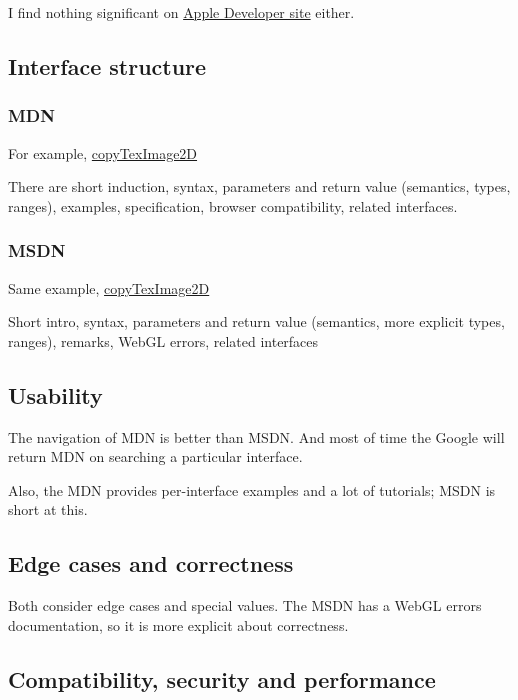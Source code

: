 I find nothing significant on \href{https://developer.apple.com}{Apple
Developer site} either.

\subsection{Interface structure}\label{interface-structure}

\subsubsection{MDN}\label{mdn}

For example,
\href{https://developer.mozilla.org/en-US/docs/Web/API/WebGLRenderingContext/copyTexImage2D}{copyTexImage2D}

There are short induction, syntax, parameters and return value
(semantics, types, ranges), examples, specification, browser
compatibility, related interfaces.

\subsubsection{MSDN}\label{msdn}

Same example,
\href{https://msdn.microsoft.com/en-us/library/dn302380(v=vs.85).aspx}{copyTexImage2D}

Short intro, syntax, parameters and return value (semantics, more
explicit types, ranges), remarks, WebGL errors, related interfaces

\subsection{Usability}\label{usability}

The navigation of MDN is better than MSDN. And most of time the Google
will return MDN on searching a particular interface.

Also, the MDN provides per-interface examples and a lot of tutorials;
MSDN is short at this.

\subsection{Edge cases and
correctness}\label{edge-cases-and-correctness}

Both consider edge cases and special values. The MSDN has a WebGL errors
documentation, so it is more explicit about correctness.

\subsection{Compatibility, security and
performance}\label{compatibility-security-and-performance}

